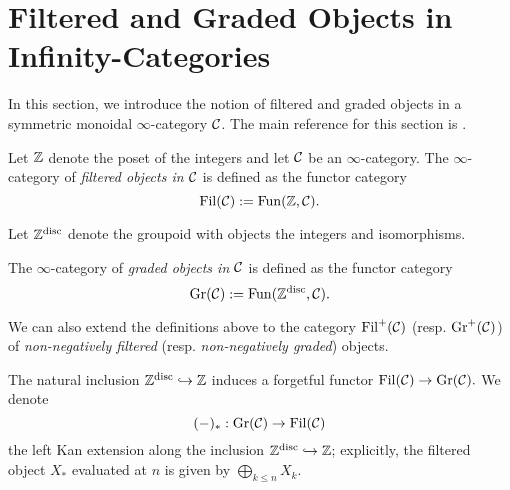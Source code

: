 %	
%

\section{Filtered and Graded Objects in Infinity-Categories}
In this section, we introduce the notion of filtered and graded objects in a symmetric monoidal $\infty$-category ${\mathcal{C}}$.
The main reference for this section is \cite{Brantner-Mathew}.
\begin{definition}
	Let ${\mathbb{Z}}$ denote the poset of the integers and let ${\mathcal{C}}$ be an $\infty$-category.
	The $\infty$-category of \emph{filtered objects in ${\mathcal{C}}$} is defined as the functor category 
	$$
	\operatorname{\operatorname{Fil}}({\mathcal{C}}) :=\operatorname{Fun}({\mathbb{Z}}, {\mathcal{C}}).
	$$
\end{definition}

Let ${\mathbb{Z}}^{\operatorname{disc}}$ denote the groupoid with objects the integers and isomorphisms.
\begin{definition}
	The $\infty$-category of \emph{graded objects in ${\mathcal{C}}$} is defined as the functor category 
	$$
	\operatorname{\operatorname{Gr}}({\mathcal{C}}):=\operatorname{Fun}({\mathbb{Z}}^{\operatorname{disc}}, {\mathcal{C}}).
	$$
\end{definition}

\begin{remark}
	We can also extend the definitions above to the category $\operatorname{\operatorname{Fil}}^{+}({\mathcal{C}})$ (resp. $\operatorname{Gr}^{+}({\mathcal{C}})$) of \emph{non-negatively filtered} (resp. \emph{non-negatively graded}) objects.
\end{remark}

The natural inclusion $ {\mathbb{Z}}^{\operatorname{disc}}\hookrightarrow {\mathbb{Z}}$ induces a forgetful functor
$
\operatorname{\operatorname{Fil}}({\mathcal{C}}) \to \operatorname{Gr}({\mathcal{C}}). 
$
We denote $$
(-)_*: \operatorname{\operatorname{Gr}}({\mathcal{C}}) \to \operatorname{\operatorname{Fil}}({\mathcal{C}})
$$ the left Kan extension along the inclusion $ {\mathbb{Z}}^{\operatorname{disc}}\hookrightarrow {\mathbb{Z}}$; explicitly, the filtered object $X_*$ evaluated at $n$ is given by $\bigoplus_{k\leq n} X_k$.


